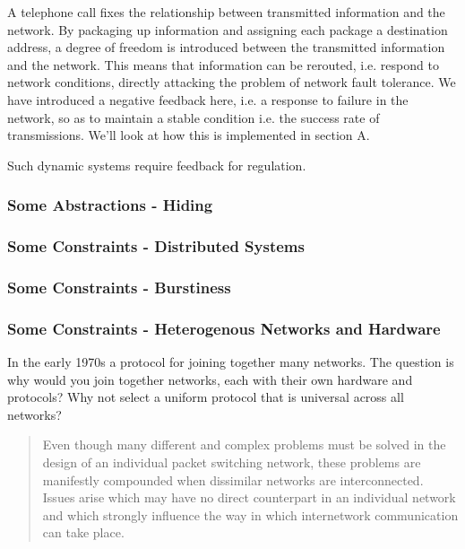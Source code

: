 

A telephone call fixes the relationship between transmitted information and the network. By
packaging up information and assigning each package a destination address, a degree of freedom is
introduced between the transmitted information and the network. This means that information can be
rerouted, i.e. respond to network conditions, directly attacking the problem of network fault
tolerance. We have introduced a negative feedback here, i.e. a response to failure in the network,
so as to maintain a stable condition i.e. the success rate of transmissions. We'll look at how this
is implemented in section A.

Such dynamic systems require feedback for regulation.

\subsubsection{Some Abstractions - Hiding}


\subsubsection{Some Constraints - Distributed Systems}

\subsubsection{Some Constraints - Burstiness}

\subsubsection{Some Constraints - Heterogenous Networks and Hardware}

In the early 1970s a protocol for joining together many networks. The question is why would you
join together networks, each with their own hardware and protocols? Why not select a uniform
protocol that is universal across all networks?

\begin{quote}
    Even though many different and complex problems must be solved in the design of an individual
    packet switching network, these problems are manifestly compounded when dissimilar networks are
    interconnected. Issues arise which may have no direct counterpart in an individual network and
    which strongly influence the way in which internetwork communication can take place.
    \cite{cerf1974}
\end{quote}

